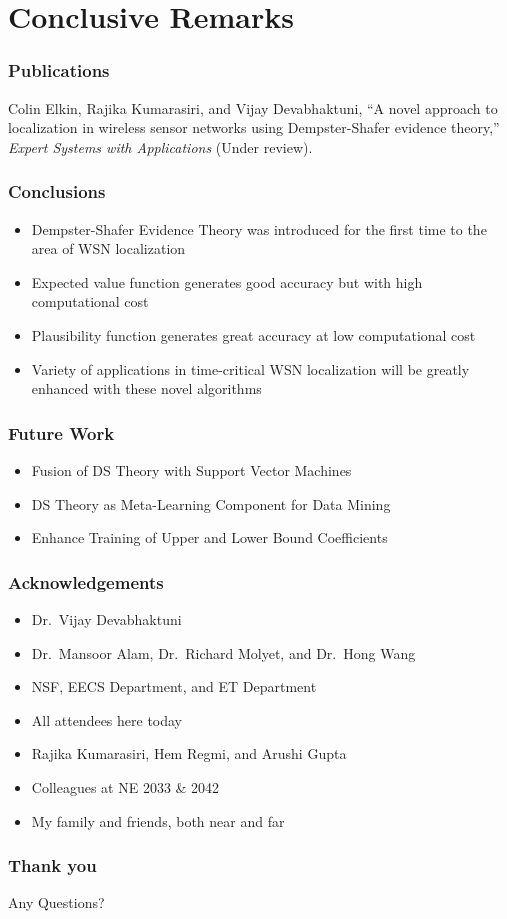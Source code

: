 \documentclass{beamer}
\begin{document}

\section{Conclusive Remarks}

\begin{frame}
\frametitle{Publications}
Colin Elkin, Rajika Kumarasiri, and Vijay Devabhaktuni, ``A novel approach to localization in wireless sensor networks using Dempster-Shafer evidence theory,'' {\it Expert Systems with Applications} (Under review).
\end{frame}

\begin{frame}
\frametitle{Conclusions}
\begin{itemize}
\item{Dempster-Shafer Evidence Theory was introduced for the first time to the area of WSN localization}
\item{Expected value function generates good accuracy but with high computational cost}
\item{Plausibility function generates great accuracy at low computational cost}
\item{Variety of applications in time-critical WSN localization will be greatly enhanced with these novel algorithms}
\end{itemize}
\end{frame}

\begin{frame}
\frametitle{Future Work}
\begin{itemize}
\item{Fusion of DS Theory with Support Vector Machines}
\item{DS Theory as Meta-Learning Component for Data Mining}
\item{Enhance Training of Upper and Lower Bound Coefficients}
\end{itemize}
\end{frame}

\begin{frame}
\frametitle{Acknowledgements}
\begin{itemize}
\item{Dr.~Vijay Devabhaktuni}
\item{Dr.~Mansoor Alam, Dr.~Richard Molyet, and Dr.~Hong Wang}
\item{NSF, EECS Department, and ET Department}
\item{All attendees here today}
\item{Rajika Kumarasiri, Hem Regmi, and Arushi Gupta}
\item{Colleagues at NE 2033 \& 2042}
\item{My family and friends, both near and far}
\end{itemize}
\end{frame}

\begin{frame}
\frametitle{Thank you}
\Huge{\centerline{Any Questions?}}
\end{frame}

\end{document}
